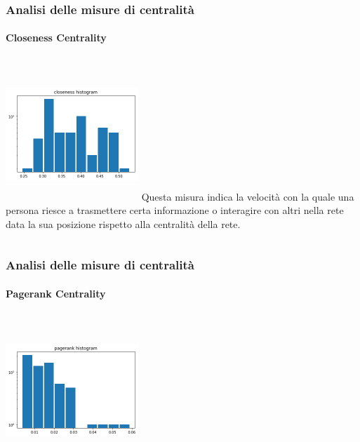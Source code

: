 \documentclass{beamer}
\begin{document}

\begin{frame}
\frametitle{Analisi delle misure di centralità}
\framesubtitle{Closeness Centrality}
\begin{columns}
             \centering
             \includegraphics[height=5cm, width=5cm]{misure_grafo/closeness_all.png}
             Questa misura indica la velocità con la quale una persona riesce a trasmettere certa informazione o interagire con altri nella rete data la sua posizione rispetto alla centralità della rete. 
         \end{columns} 

\end{frame}

\begin{frame}
\frametitle{Analisi delle misure di centralità}
\framesubtitle{Pagerank Centrality}
\begin{columns}
             \centering
             \includegraphics[height=5cm, width=5cm]{misure_grafo/pr_all.png}
        
         \end{columns} 

\end{frame}

\end{document}
